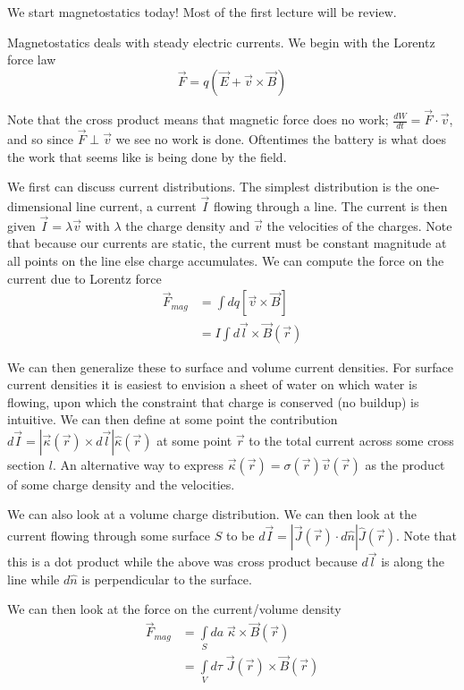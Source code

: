 \documentclass[10pt]{report}
\newcommand{\rd}[2]{\frac{d#1}{d#2}}
\newcommand{\abs}[1]{\left|#1\right|}
\begin{document}
We start magnetostatics today! Most of the  first lecture will be review. 

Magnetostatics deals with steady electric currents. We begin with the Lorentz force law
\begin{equation}
    \vec{F} = q\left( \vec{E} + \vec{v}\times\vec{B} \right)
\end{equation}

Note that the cross product means that magnetic force does no work; $\rd{W}{t} = \vec{F}\cdot \vec{v}$, and so since $\vec{F} \perp \vec{v}$ we see no work is done. Oftentimes the battery is what does the work that seems like is being done by the field.

We first can discuss current distributions. The simplest distribution is the one-dimensional line current, a current $\vec{I}$ flowing through a line. The current is then given $\vec{I} = \lambda \vec{v}$ with $\lambda$ the charge density and $\vec{v}$ the velocities of the charges. Note that because our currents are static, the current must be constant magnitude at all points on the line else charge accumulates. We can compute the force on the current due to Lorentz force
\begin{align}
    \vec{F}_{mag} &= \int dq \left[ \vec{v}\times\vec{B} \right]\\
    &= I\int d\vec{l}\times\vec{B}(\vec{r})
\end{align}

We can then generalize these to surface and volume current densities. For surface current densities it is easiest to envision a sheet of water on which water is flowing, upon which the constraint that charge is conserved (no buildup) is intuitive. We can then define at some point the contribution $d\vec{I} = \abs{\vec{\kappa}(\vec{r})\times d\vec{l}} \hat{\kappa}(\vec{r})$ at some point $\vec{r}$ to the total current across some cross section $l$. An alternative way to express $\vec{\kappa}(\vec{r}) = \sigma(\vec{r})\vec{v}(\vec{r})$ as the product of some charge density and the velocities.

We can also look at a volume charge distribution. We can then look at the current flowing through some surface $S$ to be $d\vec{I} = \abs{\vec{J}(\vec{r}) \cdot d\hat{n}}\hat{J}(\vec{r})$. Note that this is a dot product while the above was cross product because $d\vec{l}$ is along the line while $d\hat{n}$ is perpendicular to the surface.

We can then look at the force on the current/volume density
\begin{align}
    \vec{F}_{mag} &= \int\limits_{S}^{}da\;\vec{\kappa}\times\vec{B}(\vec{r})\\
    &= \int\limits_{V}^{}d\tau\;\vec{J}(\vec{r}) \times \vec{B}(\vec{r})
\end{align}
\end{document}
